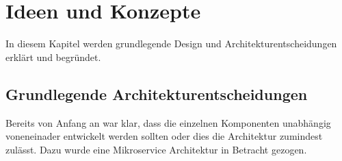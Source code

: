 \chapter{Ideen und Konzepte}




%



%
%

In diesem Kapitel werden grundlegende Design und Architekturentscheidungen erklärt
und begründet.

\section{Grundlegende Architekturentscheidungen}
\label{konzepte:microservices}

Bereits von Anfang an war klar, dass die einzelnen Komponenten unabhängig voneneinader
entwickelt werden sollten oder dies die Architektur zumindest zulässt. Dazu wurde
eine Mikroservice Architektur in Betracht gezogen.

